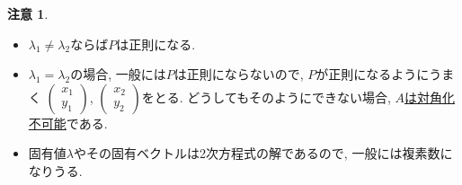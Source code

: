 \documentclass[dvipdfmx,a4paper,11pt]{article}
\theoremstyle{definition}
\newtheorem{rem}[thm]{注意}
\begin{document}
 \begin{rem}
 \begin{itemize}
 \setlength{\parskip}{0cm}
  	\setlength{\itemsep}{0pt} 
\item $\lambda_1 \neq \lambda_2$ならば$P$は正則になる.
\item $\lambda_1 = \lambda_2$の場合, 一般には$P$は正則にならないので, $P$が正則になるようにうまく $ \begin{pmatrix}
x_1 \\ y_1
 \end{pmatrix}  
 $,  $ \begin{pmatrix}
x_2 \\ y_2
 \end{pmatrix}  
 $をとる. どうしてもそのようにできない場合, \underline{$A$は対角化不可能}である. 
 \item 固有値$\lambda$やその固有ベクトルは2次方程式の解であるので, 一般には複素数になりうる. 
 \end{itemize}
 \end{rem}
\end{document}
